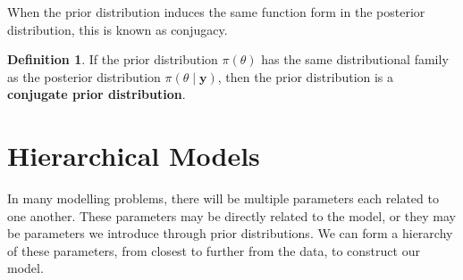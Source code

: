\documentclass[
]{book}
\theoremstyle{definition}
\newtheorem{definition}{Definition}[chapter]
\theoremstyle{definition}
\theoremstyle{definition}
\theoremstyle{definition}
\theoremstyle{remark}
\begin{document}
When the prior distribution induces the same function form in the posterior distribution, this is known as conjugacy.

\begin{definition}
If the prior distribution \(\pi(\theta)\) has the same distributional family as the posterior distribution \(\pi(\theta \mid \boldsymbol{y})\), then the prior distribution is a \textbf{conjugate prior distribution}.
\end{definition}

\hypertarget{hierarchical-models}{%
\section{Hierarchical Models}\label{hierarchical-models}}

In many modelling problems, there will be multiple parameters each related to one another. These parameters may be directly related to the model, or they may be parameters we introduce through prior distributions. We can form a hierarchy of these parameters, from closest to further from the data, to construct our model.
\end{document}
